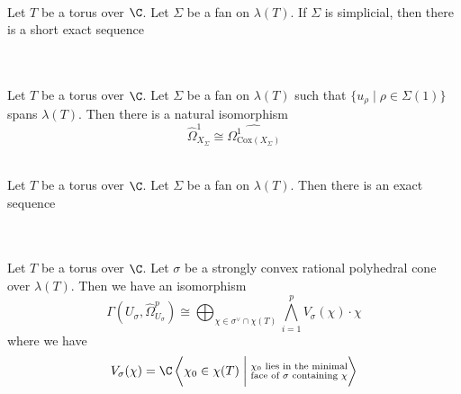 \documentclass[a4paper]{article}
\begin{document}
\begin{prp}{}{}\\
Let $T$ be a torus over $\C$. Let $\Sigma$ be a fan on $\lambda(T)$. If $\Sigma$ is simplicial, then there is a short exact sequence  \\
\\
\end{prp}

\begin{prp}{}{}\\
Let $T$ be a torus over $\C$. Let $\Sigma$ be a fan on $\lambda(T)$ such that $\{u_\rho\;|\;\rho\in\Sigma(1)\}$ spans $\lambda(T)$. Then there is a natural isomorphism $$\widehat{\Omega}_{X_\Sigma}^1\cong\widehat{\Omega_{\text{Cox}(X_\Sigma)}^1}$$
\end{prp}

\begin{prp}{}{}\\
Let $T$ be a torus over $\C$. Let $\Sigma$ be a fan on $\lambda(T)$. Then there is an exact sequence \\
\\
\end{prp}

\begin{prp}{}{}\\
Let $T$ be a torus over $\C$. Let $\sigma$ be a strongly convex rational polyhedral cone over $\lambda(T)$. Then we have an isomorphism $$\Gamma(U_\sigma,\widehat{\Omega}_{U_\sigma}^p)\cong\bigoplus_{\chi\in\sigma^\vee\cap\chi(T)}\bigwedge_{i=1}^p V_\sigma(\chi)\cdot\chi$$ where we have $$V_\sigma(\chi)=\C\left\langle\chi_0\in\chi(T)\;\bigg{|}\;\substack{\chi_0\text{ lies in the minimal}\\\text{face of }\sigma\text{ containing }\chi}\right\rangle$$
\end{prp}
\end{document}
